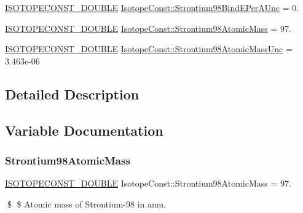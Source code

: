 \begin{DoxyCompactItemize}
\mbox{\hyperlink{group___isotope_const-_macros_ga8f45a7272ce02c0b4c65c44636ed719a}{I\+S\+O\+T\+O\+P\+E\+C\+O\+N\+S\+T\+\_\+\+D\+O\+U\+B\+LE}} \mbox{\hyperlink{group___isotope_const-_strontium-_sr98_ga243d2e6b5c1311a4426cbd59d696dc9c}{Isotope\+Const\+::\+Strontium98\+Bind\+E\+Per\+A\+Unc}} = 0.
\item 
\mbox{\hyperlink{group___isotope_const-_macros_ga8f45a7272ce02c0b4c65c44636ed719a}{I\+S\+O\+T\+O\+P\+E\+C\+O\+N\+S\+T\+\_\+\+D\+O\+U\+B\+LE}} \mbox{\hyperlink{group___isotope_const-_strontium-_sr98_ga607ad22b8f2b8db9843be17601f0c1bb}{Isotope\+Const\+::\+Strontium98\+Atomic\+Mass}} = 97.
\item 
\mbox{\hyperlink{group___isotope_const-_macros_ga8f45a7272ce02c0b4c65c44636ed719a}{I\+S\+O\+T\+O\+P\+E\+C\+O\+N\+S\+T\+\_\+\+D\+O\+U\+B\+LE}} \mbox{\hyperlink{group___isotope_const-_strontium-_sr98_gaf8fa06561737da86ede9139b5cc56b4d}{Isotope\+Const\+::\+Strontium98\+Atomic\+Mass\+Unc}} = 3.\+463e-\/06
\end{DoxyCompactItemize}


\subsection{Detailed Description}


\subsection{Variable Documentation}
\mbox{\label{group___isotope_const-_strontium-_sr98_ga607ad22b8f2b8db9843be17601f0c1bb}} 
\subsubsection{\texorpdfstring{Strontium98\+Atomic\+Mass}{Strontium98AtomicMass}}
{\footnotesize\ttfamily \mbox{\hyperlink{group___isotope_const-_macros_ga8f45a7272ce02c0b4c65c44636ed719a}{I\+S\+O\+T\+O\+P\+E\+C\+O\+N\+S\+T\+\_\+\+D\+O\+U\+B\+LE}} Isotope\+Const\+::\+Strontium98\+Atomic\+Mass = 97.}

\$ \$ Atomic mass of Strontium-\/98 in amu. \mbox{\label{group___isotope_const-_strontium-_sr98_gaf8fa06561737da86ede9139b5cc56b4d}} 
